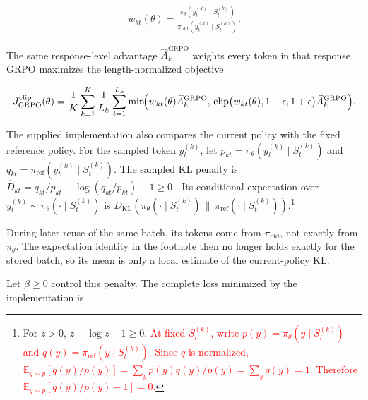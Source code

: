 \documentclass[11pt]{article}
\newcommand{\E}{\mathbb{E}}
\newcommand{\KL}{D_{\mathrm{KL}}}
\begin{document}
\begin{equation}
    \begin{split}
    w_{kt}(\theta)
      =\frac{
        \pi_\theta(y_t^{(k)}\mid S_t^{(k)})
      }{
        \pi_{\mathrm{old}}(y_t^{(k)}\mid S_t^{(k)})
      }.
    \end{split}
    \label{eq:grpo-token-ratio}
\end{equation}

The same response-level advantage \(\widehat A_k^{\mathrm{GRPO}}\) weights
every token in that response.  GRPO maximizes the length-normalized objective

\begin{equation}
    \begin{split}
    J_{\mathrm{GRPO}}^{\mathrm{clip}}(\theta)
      =\frac{1}{K}\sum_{k=1}^{K}\frac{1}{L_k}
       \sum_{t=1}^{L_k}
       \min\!\Bigl(
          w_{kt}(\theta)\widehat A_k^{\mathrm{GRPO}},\,
          \operatorname{clip}
          \bigl(w_{kt}(\theta),1-\epsilon,1+\epsilon\bigr)
          \widehat A_k^{\mathrm{GRPO}}
       \Bigr).
    \end{split}
    \label{eq:grpo-clipped-objective}
\end{equation}

The supplied implementation also compares the current policy with the fixed
reference policy.  For the sampled token \(y_t^{(k)}\), let
\(p_{kt}=\pi_\theta(y_t^{(k)}\mid S_t^{(k)})\) and
\(q_{kt}=\pi_{\mathrm{ref}}(y_t^{(k)}\mid S_t^{(k)})\).  The sampled KL
penalty is
\(\widehat D_{kt}=q_{kt}/p_{kt}-\log(q_{kt}/p_{kt})-1\geq0\)
\cite{shao2024deepseekmath}.  Its conditional expectation over
\(y_t^{(k)}\sim\pi_\theta(\cdot\mid S_t^{(k)})\) is
\(\KL\!\left(\pi_\theta(\cdot\mid S_t^{(k)})\,\|\,
\pi_{\mathrm{ref}}(\cdot\mid S_t^{(k)})\right)\).\footnote{For \(z>0\),
\(z-\log z-1\geq0\).  \textcolor{red}{At fixed \(S_t^{(k)}\), write
\(p(y)=\pi_\theta(y\mid S_t^{(k)})\) and
\(q(y)=\pi_{\mathrm{ref}}(y\mid S_t^{(k)})\).  Since \(q\) is normalized,
\(\E_{y\sim p}[q(y)/p(y)]
=\sum_y p(y)q(y)/p(y)=\sum_y q(y)=1\).  Therefore
\(\E_{y\sim p}[q(y)/p(y)-1]=0\).}}

During later reuse of the same batch, its tokens come from
\(\pi_{\mathrm{old}}\), not exactly from \(\pi_\theta\).  The expectation
identity in the footnote then no longer holds exactly for the stored batch, so
its mean is only a local estimate of the current-policy KL.

Let \(\beta\geq0\) control this penalty.  The complete loss minimized by the
implementation is
\end{document}
